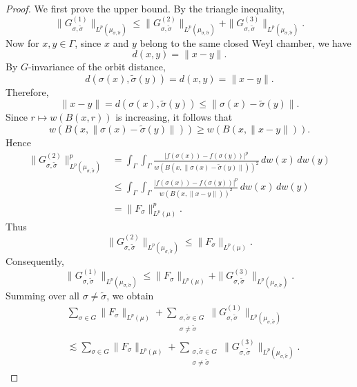 \documentclass[12pt]{amsart}
\begin{document}
\begin{proof}
We first prove the upper bound. By the triangle inequality,
\[
\|G_{\sigma,\tilde{\sigma}}^{(1)}\|_{L^p(\mu_{\sigma,\tilde{\sigma}})}
\le
\|G_{\sigma,\tilde{\sigma}}^{(2)}\|_{L^p(\mu_{\sigma,\tilde{\sigma}})}
+
\|G_{\sigma,\tilde{\sigma}}^{(3)}\|_{L^p(\mu_{\sigma,\tilde{\sigma}})}.
\]
Now for \(x,y\in \Gamma\), since \(x\) and \(y\) belong to the same closed Weyl chamber, we have
\[
d(x,y)=\|x-y\|.
\]
By \(G\)-invariance of the orbit distance,
\[
d(\sigma(x),\tilde{\sigma}(y))=d(x,y)=\|x-y\|.
\]
Therefore,
\[
\|x-y\|=d(\sigma(x),\tilde{\sigma}(y))
\le
\|\sigma(x)-\tilde{\sigma}(y)\|.
\]
Since \(r\mapsto w(B(x,r))\) is increasing, it follows that
\[
w(B(x,\|\sigma(x)-\tilde{\sigma}(y)\|))
\ge
w(B(x,\|x-y\|)).
\]
Hence
\begin{align*}
\|G_{\sigma,\tilde{\sigma}}^{(2)}\|_{L^p(\mu_{\sigma,\tilde{\sigma}})}^p
&=
\int_{\Gamma}\int_{\Gamma}
\frac{|f(\sigma(x))-f(\sigma(y))|^p}
{w(B(x,\|\sigma(x)-\tilde{\sigma}(y)\|))^2}
\,dw(x)\,dw(y)
\\
&\le
\int_{\Gamma}\int_{\Gamma}
\frac{|f(\sigma(x))-f(\sigma(y))|^p}
{w(B(x,\|x-y\|))^2}
\,dw(x)\,dw(y)
\\
&=
\|F_\sigma\|_{L^p(\mu)}^p.
\end{align*}
Thus
\[
\|G_{\sigma,\tilde{\sigma}}^{(2)}\|_{L^p(\mu_{\sigma,\tilde{\sigma}})}
\le
\|F_\sigma\|_{L^p(\mu)}.
\]
Consequently,
\[
\|G_{\sigma,\tilde{\sigma}}^{(1)}\|_{L^p(\mu_{\sigma,\tilde{\sigma}})}
\le
\|F_\sigma\|_{L^p(\mu)}
+
\|G_{\sigma,\tilde{\sigma}}^{(3)}\|_{L^p(\mu_{\sigma,\tilde{\sigma}})}.
\]
Summing over all \(\sigma\neq \tilde{\sigma}\), we obtain
\begin{align*}
&\sum_{\sigma\in G}\|F_\sigma\|_{L^p(\mu)}
+
\sum_{\substack{\sigma,\tilde{\sigma}\in G\\ \sigma\neq \tilde{\sigma}}}
\|G_{\sigma,\tilde{\sigma}}^{(1)}\|_{L^p(\mu_{\sigma,\tilde{\sigma}})}
\\
&\lesssim
\sum_{\sigma\in G}\|F_\sigma\|_{L^p(\mu)}
+
\sum_{\substack{\sigma,\tilde{\sigma}\in G\\ \sigma\neq \tilde{\sigma}}}
\|G_{\sigma,\tilde{\sigma}}^{(3)}\|_{L^p(\mu_{\sigma,\tilde{\sigma}})}.
\end{align*}


\end{proof}
\end{document}
